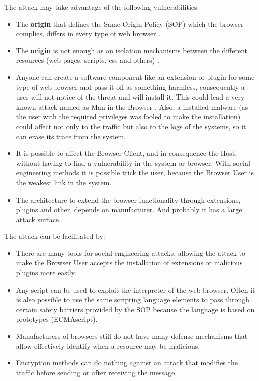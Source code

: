\documentclass{sig-alternate-05-2015}
\begin{document}
The attack may take advantage of the following vulnerabilities:
\begin{itemize}
  \item The \textbf{origin} that defines the Same Origin Policy (SOP) which the browser complies, differs in every type of web browser \cite{W3C-SOP,Reis2009, Jackson2008, Crowley2010, Paola2006}.
  \item The \textbf{origin} is not enough as an isolation mechanisms between the different resources (web pages, scripts, css and others) \cite{Silic2010, Barth2009, Yason, Liu2012}.
  \item Anyone can create a software component like an extension or plugin for some type of web browser and pass it off as something harmless, consequently a user will not notice of the threat and will install it. This could lead a very known attack named as Man-in-the-Browser \cite{Dougan2012,Utakrit2009,Liu2012,Barth2010}. Also, a installed malware (as the user with the required privileges was fooled to make the installation) could affect not only to the traffic but also to the logs of the systems, so it can erase its trace from the system.
  \item It is possible to affect the Browser Client, and in consequence the Host, without having to find a vulnerability in the system or browser. With social engineering methods it is possible trick the user, because the Browser User is the weakest link in the system.
  \item The architecture to extend the browser functionality through extensions, plugins and other, depends on manufacturer. And probably it has a large attack surface.
\end{itemize}

The attack can be facilitated by:
\begin{itemize}
  \item There are many tools for social engineering attacks, allowing the attack to make the Browser User accepts the installation of extensions or malicious plugins more easily.
  \item Any script can be used to exploit the interpreter of the web browser. Often it is also possible to use the same scripting language elements to pass through certain safety barriers provided by the SOP because the language is based on prototypes (ECMAscript).
  \item Manufacturers of browsers still do not have many defense mechanisms that allow effectively identify when a resource may be malicious.
  \item Encryption methods can do nothing against an attack that modifies the traffic before sending or after receiving the message.
\end{itemize}
\end{document}
